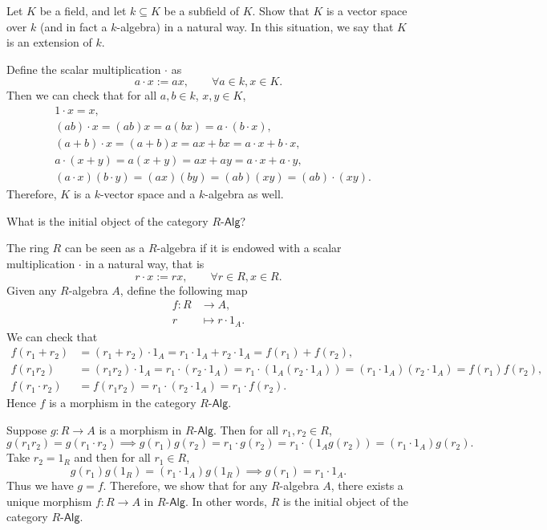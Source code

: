 \documentclass[12pt,letterpaper,boxed]{hmcpset}
\begin{document}
\begin{problem}[5.7]
Let $K$ be a field, and let $k \subseteq K$ be a subfield of $K .$ Show that $K$ is a vector space over $k$ (and in fact a $k$-algebra) in a natural way. In this situation, we say that $K$ is an extension of $k.$
\end{problem}
\begin{solution}
	Define the scalar multiplication $\cdot$ as
	\[
	a\cdot x:=ax, \qquad\forall a\in k,x\in K.
	\]
	Then we can check that for all $a,b\in k$, $x,y\in K$,
	\begin{align*}
	&1\cdot x=x,\\
	&(ab)\cdot x=(ab) x=a(bx)=a\cdot(b\cdot x),\\
	&(a+b)\cdot x=(a+b)x=ax+bx=a\cdot x+b\cdot x,\\
	&a\cdot(x+y)=a(x+y)=ax+ay=a\cdot x+a\cdot y,\\
	&(a\cdot x)(b\cdot y)=(ax)(by)=(ab)(xy)=(ab)\cdot(xy).
	\end{align*}
	Therefore, $K$ is a $k$-vector space and a $k$-algebra as well.
\end{solution}

\begin{problem}[5.8]
	What is the initial object of the category $R$-$\mathsf{Alg}$?
\end{problem}
\begin{solution}
    The ring $R$ can be seen as a $R$-algebra if it is endowed with a scalar multiplication $\cdot$ in a natural way, that is 
	\[
	r\cdot x:=rx, \qquad\forall r\in R,x\in R.
	\]
	Given any $R$-algebra $A$, define the following map
	\begin{align*}
	f:R& \longrightarrow A,\\
	r& \longmapsto r\cdot 1_A.
	\end{align*}
	We can check that
	\begin{align*}
	f(r_1+r_2)&=(r_1+r_2)\cdot 1_A=r_1\cdot 1_A+r_2\cdot 1_A=f(r_1)+f(r_2),\\
	f(r_1r_2)&=(r_1r_2)\cdot 1_A=r_1\cdot(r_2\cdot 1_A)=r_1\cdot (1_A(r_2\cdot 1_A))=(r_1\cdot 1_A)(r_2\cdot 1_A)=f(r_1)f(r_2),\\
	f(r_1\cdot r_2)&=f(r_1r_2)=r_1\cdot(r_2\cdot 1_A)=r_1\cdot f(r_2).
	\end{align*}
	Hence $f$ is a morphism in the category $R$-$\mathsf{Alg}$.
	
	Suppose $g:R\to A$ is a morphism in $R$-$\mathsf{Alg}$. Then for all $r_1,r_2\in R$,
	\[
	g(r_1r_2)=g(r_1\cdot r_2)\implies g(r_1)g(r_2)=r_1\cdot g(r_2)=r_1\cdot(1_Ag(r_2))=(r_1\cdot1_A)g(r_2).
	\]
	Take $r_2=1_R$ and then for all $r_1\in R$,
	\[
	g(r_1)g(1_R)=(r_1\cdot1_A)g(1_R)\implies g(r_1)=r_1\cdot1_A.
	\]
	Thus we have $g=f$. Therefore, we show that for any $R$-algebra $A$, there exists a unique morphism $f:R\to A$ in $R$-$\mathsf{Alg}$. In other words, $R$ is the initial object of the category $R$-$\mathsf{Alg}$.
\end{solution}
\end{document}
